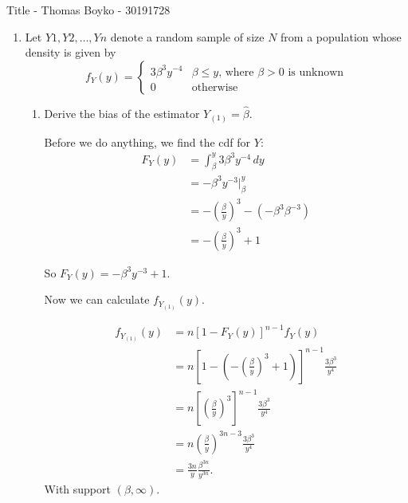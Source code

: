 \documentclass{article}
\begin{document}
    \huge Title - Thomas Boyko - 30191728
    \normalsize
\begin{enumerate} 
\item  Let $Y1, Y2, \ldots , Yn$ denote a random sample of size $N$ from a population whose density is given by
$$f_Y (y) =\begin{cases}
    3\beta^3y^{-4}& \beta\leq y, \,\text{where $\beta>0$ is unknown}\\
    0&\text{otherwise}
\end{cases}$$

   \begin{enumerate}[label= (\alph*)]
    \item Derive the bias of the estimator $Y_{(1)}=\hat{\beta}$.
    
    Before we do anything, we find the cdf for $Y$:
        \begin{align*}
            F_Y(y)&=\int_{\beta}^{y} 3\beta^3y^{-4} \, d y \\
            &= -\beta^3y^{-3}\Big|_{\beta}^{y} \\
            &= -\left(\frac{\beta}{y}\right)^3-(-\beta^3\beta^{-3}) \\
            &= -\left(\frac{\beta}{y}\right)^3 +1
        \end{align*}

        So $F_Y(y)=-\beta^3y^{-3}+1$.

        Now we can calculate $f_{Y_{(1)}}(y)$.

        \begin{align*}
            f_{Y_{(1)}}(y)&= n\left[ 1-F_Y(y) \right]^{n-1}f_Y(y) \\
            &= n\left[1-\left( -\left(\frac{\beta}{y}\right)^{3}+1 \right) \right] ^{n-1}\frac{3\beta^3}{y^{4}} \\
            &= n\left[\left(\frac{\beta}{y}\right)^{3} \right] ^{n-1}\frac{3\beta^3}{y^{4}} \\
            &= n\left( \frac{\beta}{y} \right) ^{3n-3}\frac{3\beta^3}{y^{4}} \\
            &=\frac{3n}{y} \frac{\beta^{3n}}{y^{3n}}
        .\end{align*}
        With support $(\beta,\infty)$.


\end{enumerate}
\end{enumerate}
\end{document}

